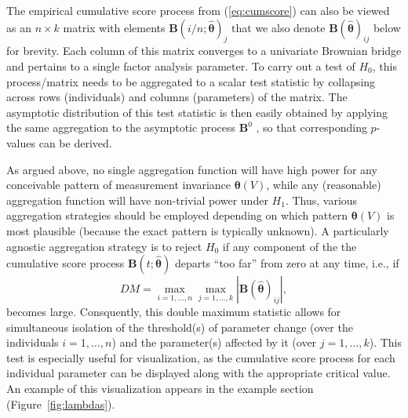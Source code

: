 \documentclass[man]{apa}
\begin{document}
The empirical cumulative score process from (\ref{eq:cumscore}) can also be viewed
as an $n \times k$ matrix with elements ${\bm B}(i/n; \hat {\bm \theta})_j$ that
we also denote ${\bm B}(\hat {\bm \theta})_{ij}$ below for brevity.
Each column of this matrix converges to a univariate Brownian bridge and pertains
to a single factor analysis parameter. To carry out a test of $H_0$, this process/matrix
needs to be aggregated to a scalar test statistic by collapsing across
rows (individuals) and columns (parameters) of the matrix. The asymptotic distribution
of this test statistic is then easily obtained by applying the same
aggregation to the asymptotic process ${\bm B}^0$ \cite{HjoKon02,ZeiHor07},
so that corresponding $p$-values can be derived.

As argued above, no single aggregation function will have high power for any
conceivable pattern of measurement invariance ${\bm \theta}(V)$, while any
(reasonable) aggregation function will have non-trivial power under $H_1$.
Thus, various aggregation strategies should be employed depending on which
pattern ${\bm \theta}(V)$ is most plausible (because the exact pattern
is typically
unknown). A particularly agnostic aggregation strategy is to reject $H_0$
if any component of the the cumulative score process ${\bm B}(t; \hat {\bm \theta})$
departs ``too far'' from zero at any time, i.e., if
\begin{equation}
    \label{eq:dmax}
    \mathit{DM} = \max_{i = 1,\dots, n} \max_{j = 1, \dots, k} | {\bm B}(\hat {\bm \theta})_{ij} |,
\end{equation}
becomes large. Consquently, this double maximum statistic allows for simultaneous
isolation of the threshold(s) of parameter change (over the individuals $i = 1, \dots, n$)
and the parameter(s) affected by it (over $j = 1, \dots, k$). This test is
especially useful for visualization, as the cumulative score process for
each individual parameter can be displayed along with the appropriate
critical value.  An example of this visualization appears in the
example section (Figure~\ref{fig:lambdas}).
\end{document}
